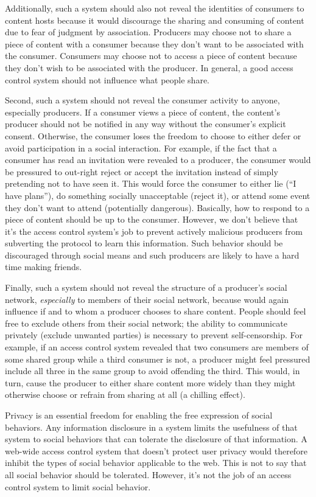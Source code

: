 \documentclass[pdftex,12pt,a4papaer,twoside,notitlepage]{report}
\begin{document}
Additionally, such a system should also not reveal the identities of consumers
to content hosts because it would discourage the sharing and consuming of
content due to fear of judgment by association. Producers may choose not to
share a piece of content with a consumer because they don't want to be
associated with the consumer. Consumers may choose not to access a piece of
content because they don't wish to be associated with the producer. In general,
a good access control system should not influence what people share.

Second, such a system should not reveal the consumer activity to anyone,
especially producers. If a consumer views a piece of content, the content's
producer should not be notified in any way without the consumer's explicit
consent. Otherwise, the consumer loses the freedom to choose to either defer or
avoid participation in a social interaction. For example, if the fact that a
consumer has read an invitation were revealed to a producer, the consumer would
be pressured to out-right reject or accept the invitation instead of simply
pretending not to have seen it. This would force the consumer to either lie (``I
have plans''), do something socially unacceptable (reject it), or attend some
event they don't want to attend (potentially dangerous). Basically, how to
respond to a piece of content should be up to the consumer. However, we don't
believe that it's the access control system's job to prevent actively malicious
producers from subverting the protocol to learn this information. Such behavior
should be discouraged through social means and such producers are likely to have
a hard time making friends.

Finally, such a system should not reveal the structure of a producer's social
network, \emph{especially} to members of their social network, because would
again influence if and to whom a producer chooses to share content. People
should feel free to exclude others from their social network; the ability to
communicate privately (exclude unwanted parties) is necessary to prevent
self-censorship. For example, if an access control system revealed that two
consumers are members of some shared group while a third consumer is not, a
producer might feel pressured include all three in the same group to avoid
offending the third. This would, in turn, cause the producer to either share
content more widely than they might otherwise choose or refrain from sharing at
all (a chilling effect).

Privacy is an essential freedom for enabling the free expression of social
behaviors. Any information disclosure in a system limits the usefulness of that
system to social behaviors that can tolerate the disclosure of that information.
A web-wide access control system that doesn't protect user privacy would
therefore inhibit the types of social behavior applicable to the web. This is
not to say that all social behavior should be tolerated. However, it's not the
job of an access control system to limit social behavior.
\end{document}
